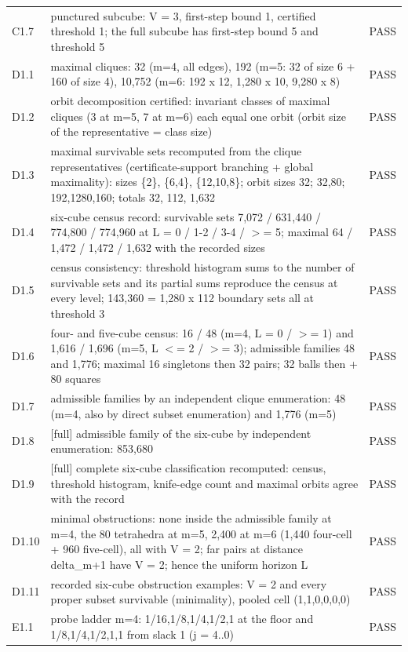 \documentclass[11pt,a4paper]{article}
\theoremstyle{plain}
\theoremstyle{definition}
\theoremstyle{remark}
\begin{document}
{\begin{longtable}{@{}l p{} l@{}}
C1.7 & punctured subcube: V = 3, first-step bound 1, certified threshold 1; the full subcube has first-step bound 5 and threshold 5 & PASS\\
D1.1 & maximal cliques: 32 (m=4, all edges), 192 (m=5: 32 of size 6 + 160 of size 4), 10,752 (m=6: 192 x 12, 1,280 x 10, 9,280 x 8) & PASS\\
D1.2 & orbit decomposition certified: invariant classes of maximal cliques (3 at m=5, 7 at m=6) each equal one orbit (orbit size of the representative = class size) & PASS\\
D1.3 & maximal survivable sets recomputed from the clique representatives (certificate-support branching + global maximality): sizes \{2\}, \{6,4\}, \{12,10,8\}; orbit sizes 32; 32,80; 192,1280,160; totals 32, 112, 1,632 & PASS\\
D1.4 & six-cube census record: survivable sets 7,072 / 631,440 / 774,800 / 774,960 at L = 0 / 1-2 / 3-4 / $>$= 5; maximal 64 / 1,472 / 1,472 / 1,632 with the recorded sizes & PASS\\
D1.5 & census consistency: threshold histogram sums to the number of survivable sets and its partial sums reproduce the census at every level; 143,360 = 1,280 x 112 boundary sets all at threshold 3 & PASS\\
D1.6 & four- and five-cube census: 16 / 48 (m=4, L = 0 / $>$= 1) and 1,616 / 1,696 (m=5, L $<$= 2 / $>$= 3); admissible families 48 and 1,776; maximal 16 singletons then 32 pairs; 32 balls then + 80 squares & PASS\\
D1.7 & admissible families by an independent clique enumeration: 48 (m=4, also by direct subset enumeration) and 1,776 (m=5) & PASS\\
D1.8 & [full] admissible family of the six-cube by independent enumeration: 853,680 & PASS\\
D1.9 & [full] complete six-cube classification recomputed: census, threshold histogram, knife-edge count and maximal orbits agree with the record & PASS\\
D1.10 & minimal obstructions: none inside the admissible family at m=4, the 80 tetrahedra at m=5, 2,400 at m=6 (1,440 four-cell + 960 five-cell), all with V = 2; far pairs at distance delta\_m+1 have V = 2; hence the uniform horizon L & PASS\\
D1.11 & recorded six-cube obstruction examples: V = 2 and every proper subset survivable (minimality), pooled cell (1,1,0,0,0,0) & PASS\\
E1.1 & probe ladder m=4: 1/16,1/8,1/4,1/2,1 at the floor and 1/8,1/4,1/2,1,1 from slack 1 (j = 4..0) & PASS\\

\end{longtable}}
\end{document}
